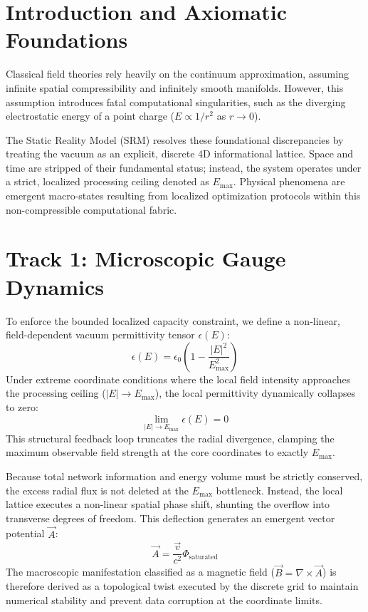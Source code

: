 \section{Introduction and Axiomatic Foundations}

Classical field theories rely heavily on the continuum approximation, assuming infinite spatial compressibility and infinitely smooth manifolds. However, this assumption introduces fatal computational singularities, such as the diverging electrostatic energy of a point charge ($E \propto 1/r^2$ as $r \to 0$). 

The Static Reality Model (SRM) resolves these foundational discrepancies by treating the vacuum as an explicit, discrete 4D informational lattice. Space and time are stripped of their fundamental status; instead, the system operates under a strict, localized processing ceiling denoted as $E_{\text{max}}$. Physical phenomena are emergent macro-states resulting from localized optimization protocols within this non-compressible computational fabric.

\section{Track 1: Microscopic Gauge Dynamics}

To enforce the bounded localized capacity constraint, we define a non-linear, field-dependent vacuum permittivity tensor $\epsilon(E)$:
\begin{equation}
    \epsilon(E) = \epsilon_0 \left( 1 - \frac{|E|^2}{E_{\text{max}}^2} \right)
\end{equation}
Under extreme coordinate conditions where the local field intensity approaches the processing ceiling ($|E| \to E_{\text{max}}$), the local permittivity dynamically collapses to zero:
\begin{equation}
    \lim_{|E| \to E_{\text{max}}} \epsilon(E) = 0
\end{equation}
This structural feedback loop truncates the radial divergence, clamping the maximum observable field strength at the core coordinates to exactly $E_{\text{max}}$.

Because total network information and energy volume must be strictly conserved, the excess radial flux is not deleted at the $E_{\text{max}}$ bottleneck. Instead, the local lattice executes a non-linear spatial phase shift, shunting the overflow into transverse degrees of freedom. This deflection generates an emergent vector potential $\vec{A}$:
\begin{equation}
    \vec{A} = \frac{\vec{v}}{c^2} \Phi_{\text{saturated}}
\end{equation}
The macroscopic manifestation classified as a magnetic field ($\vec{B} = \nabla \times \vec{A}$) is therefore derived as a topological twist executed by the discrete grid to maintain numerical stability and prevent data corruption at the coordinate limits.
